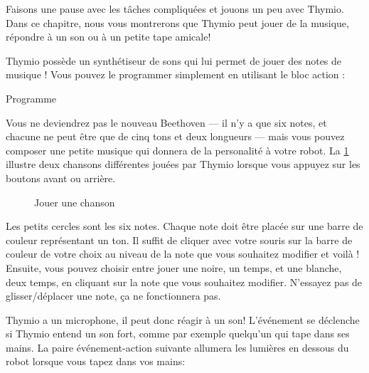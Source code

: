 \label{ch.bells}

Faisons une pause avec les tâches compliquées et jouons un peu avec Thymio.
Dans ce chapitre, nous vous montrerons que Thymio peut jouer de la musique, répondre à un son ou à un petite tape amicale!


Thymio possède un synthétiseur de sons qui lui permet de jouer des notes de musique !
Vous pouvez le programmer simplement en utilisant le bloc action :

{\raggedleft \hfill Programme }

Vous ne deviendrez pas le nouveau Beethoven --- il n'y a que six notes, et chacune ne peut être que de cinq tons et deux longueurs --- mais vous pouvez composer une petite musique qui donnera de la personalité à votre robot.
La \cref{fig.music} illustre deux chansons différentes jouées par Thymio lorsque vous appuyez sur les boutons avant ou arrière.

\begin{figure}
\begin{center}
\caption{Jouer une chanson}\label{fig.music}
\end{center}
\end{figure}

Les petits cercles sont les six notes.
Chaque note doit être placée sur une barre de couleur représentant un ton.
Il suffit de cliquer avec votre souris sur la barre de couleur de votre choix au niveau de la note que vous souhaitez modifier et voilà !
Ensuite, vous pouvez choisir entre jouer une noire, un temps, et une blanche, deux temps, en cliquant sur la note que vous souhaitez modifier.
N'essayez pas de glisser/déplacer une note, ça ne fonctionnera pas.



Thymio a un microphone, il peut donc réagir à un son! L'événement  se déclenche si Thymio entend un son fort, comme par exemple quelqu'un qui tape dans ses mains.
La paire événement-action suivante allumera les lumières en dessous du robot lorsque vous tapez dans vos mains: 

